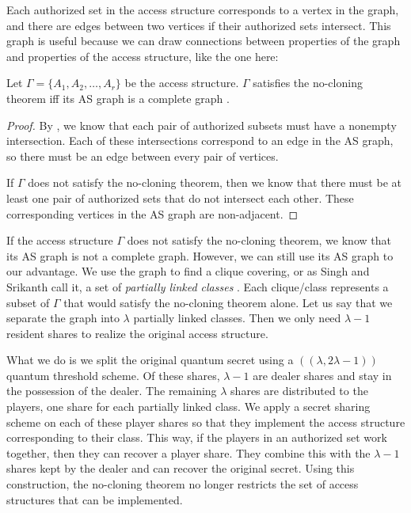 Each authorized set in the access structure corresponds to a vertex in the graph, and there are edges between two vertices if their authorized sets intersect. This graph is useful because we can draw connections between properties of the graph and properties of the access structure, like the one here:

\begin{proposition}
    \label{prop:complete-as-graph}
    Let $\Gamma = \{A_1,A_2,\dots,A_r\}$ be the access structure. $\Gamma$ satisfies the no-cloning theorem iff its AS graph is a complete graph \cite{singh_assisted_2004}.
\end{proposition}

\begin{proof}
    By , we know that each pair of authorized subsets must have a nonempty intersection. Each of these intersections correspond to an edge in the AS graph, so there must be an edge between every pair of vertices.
    
    If $\Gamma$ does not satisfy the no-cloning theorem, then we know that there must be at least one pair of authorized sets that do not intersect each other. These corresponding vertices in the AS graph are non-adjacent.
\end{proof}

If the access structure $\Gamma$ does not satisfy the no-cloning theorem, we know that its AS graph is not a complete graph. However, we can still use its AS graph to our advantage. We use the graph to find a clique covering, or as Singh and Srikanth call it, a set of \textit{partially linked classes} \cite{singh_assisted_2004}. Each clique/class represents a subset of $\Gamma$ that would satisfy the no-cloning theorem alone. Let us say that we separate the graph into $\lambda$ partially linked classes. Then we only need $\lambda - 1$ resident shares to realize the original access structure. 

What we do is we split the original quantum secret using a $((\lambda, 2 \lambda - 1))$ quantum threshold scheme. Of these shares, $\lambda-1$ are dealer shares and stay in the possession of the dealer. The remaining $\lambda$ shares are distributed to the players, one share for each partially linked class. We apply a secret sharing scheme on each of these player shares so that they implement the access structure corresponding to their class. This way, if the players in an authorized set work together, then they can recover a player share. They combine this with the $\lambda-1$ shares kept by the dealer and can recover the original secret. Using this construction, the no-cloning theorem no longer restricts the set of access structures that can be implemented.

